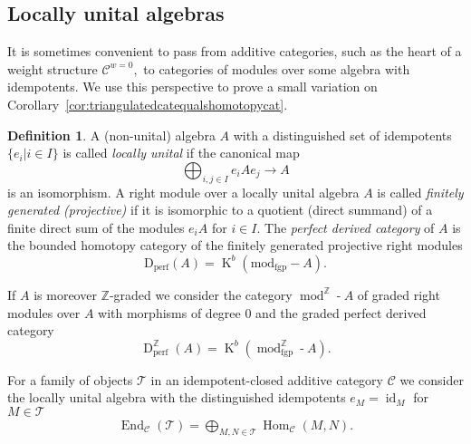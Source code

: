 \documentclass{amsart}
\theoremstyle{plain}
\theoremstyle{TheoremNum}
\theoremstyle{definition}
\newtheorem{definition}[theorem]{Definition}
\theoremstyle{remark}
\numberwithin{equation}{section}
\newcommand{\Z}{\mathbb{Z}}
\newcommand{\Cc}{\mathcal{C}}
\newcommand{\Tt}{\mathcal{T}}
\newcommand{\Dperf}{\operatorname{D_{perf}}}
\newcommand{\DperfZ}{\operatorname{D}^\Z_{\operatorname{perf}}}
\newcommand{\Hom}{\operatorname{Hom}}
\newcommand{\End}{\operatorname{End}}
\newcommand{\id}{\operatorname{id}}
\newcommand{\K}{\operatorname{K}}
\begin{document}
\subsection{Locally unital algebras}\label{sec:locallyunital}
It is sometimes convenient to pass from additive categories, such as the heart of a weight structure $\Cc^{w=0},$ to categories of modules over some algebra with idempotents.
We use this perspective to prove a small variation on Corollary~\ref{cor:triangulatedcatequalshomotopycat}.
\begin{definition} A (non-unital) algebra $A$ with a distinguished set of idempotents $\{e_i|i\in I\}$ is called \emph{locally unital} if the canonical map
$$\bigoplus_{i,j\in I}e_iAe_j\to A$$
is an isomorphism. A right module over a locally unital algebra $A$ is called \emph{finitely generated (projective)} if it is isomorphic to a quotient (direct summand) of a finite direct sum of the modules $e_i A$ for $i\in I.$
The \emph{perfect derived category} of $A$ is the bounded homotopy category of the finitely generated projective right modules
$$\Dperf(A)=\K^b(\operatorname{mod_{fgp}-}A).$$

If $A$ is moreover $\Z$-graded we consider the category $\operatorname{mod}^\Z\operatorname{-}A$ of graded right modules over $A$ with morphisms of degree $0$ and the graded perfect derived category
$$\DperfZ(A)=\K^b(\operatorname{mod}^\Z_{\operatorname{fgp}}\operatorname{-}A).$$
\end{definition}
For a family of objects $\Tt$ in an idempotent-closed additive category $\Cc$ we consider the locally unital algebra with the distinguished idempotents $e_M=\id_M$ for $M\in \Tt$
\begin{align}
    \End_\Cc(\Tt)=\bigoplus_{M,N\in \Tt}\Hom_\Cc(M,N).\label{eqn:defendt}
\end{align}
\end{document}
